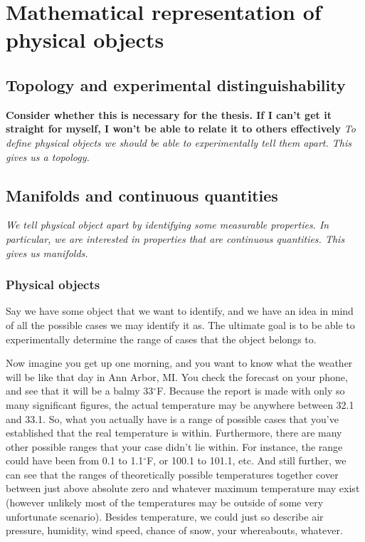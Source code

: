 \documentclass{book}
\begin{document}
\tableofcontents

\chapter{Mathematical representation of physical objects}

\section{Topology and experimental distinguishability}
\textbf{Consider whether this is necessary for the thesis. If I can't get it straight for myself, I won't be able to relate it to others effectively}
\textit{To define physical objects we should be able to experimentally tell them apart. This gives us a topology.}

\section{Manifolds and continuous quantities}
\emph{We tell physical object apart by identifying some measurable properties. In particular, we are interested in properties that are continuous quantities. This gives us manifolds.}

\subsection{Physical objects}

Say we have some object that we want to identify, and we have an idea in mind of all the possible cases we may identify it as. The ultimate goal is to be able to experimentally determine the range of cases that the object belongs to. 
 
Now imagine you get up one morning, and you want to know what the weather will be like that day in Ann Arbor, MI. You check the forecast on your phone, and see that it will be a balmy 33$^{\circ}$F. Because the report is made with only so many significant figures, the actual temperature may be anywhere between 32.1 and 33.1. So, what you actually have is a range of possible cases that you've established that the real temperature is within. Furthermore, there are many other possible ranges that your case didn't lie within. For instance, the range could have been from 0.1 to 1.1$^{\circ}$F, or 100.1 to 101.1, etc. And still further, we can see that the ranges of theoretically possible temperatures together cover between just above absolute zero and whatever maximum temperature may exist (however unlikely most of the temperatures may be outside of some very unfortunate scenario). Besides temperature, we could just so describe air pressure, humidity, wind speed, chance of snow, your whereabouts, whatever. 
\end{document}
